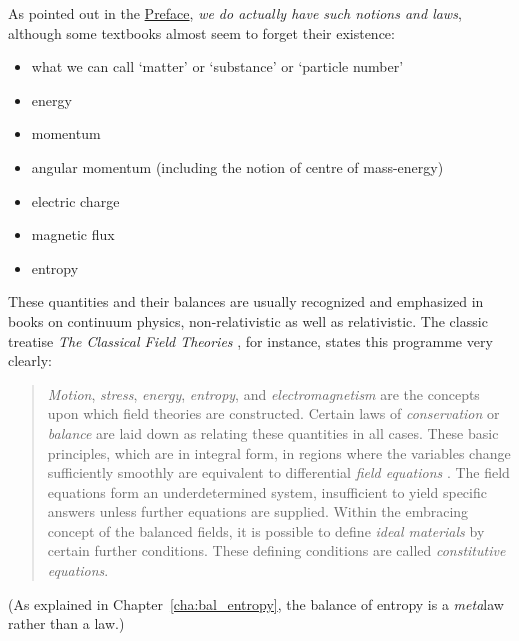 \documentclass[a4paper,12pt,%
onecolumn,oneside,%
british%
]{memoir}
\renewcommand*{\|}[1][]{\nonscript\:#1\vert\nonscript\:\mathopen{}}
\newcommand*{\chap}{Chapter}%
\newcommand*{\masse}{mass-energy}
\begin{document}
As pointed out in the \hyperref[cha:preface]{Preface}, \emph{we do actually have such notions and laws}, although some textbooks almost seem to forget their existence:
\begin{itemize}[nosep]
\item what we can call \enquote*{matter} or \enquote*{substance} or \enquote*{particle number}
\item energy
\item momentum
\item angular momentum (including the notion of centre of \masse)
\item electric charge
\item magnetic flux
\item entropy
\end{itemize}
These quantities and their balances are usually recognized and emphasized in books on continuum physics, non-relativistic as well as relativistic. The classic treatise \emph{The Classical Field Theories} \parencites*{truesdelletal1960}, for instance, states this programme very clearly:
\begin{quote}
  \emph{Motion}, \emph{stress}, \emph{energy}, \emph{entropy}, and \emph{electromagnetism} are the concepts upon which field theories are constructed. Certain laws of \emph{conservation} or \emph{balance} are laid down as relating these quantities in all cases. These basic principles, which are in integral form, in regions where the variables change sufficiently smoothly are equivalent to differential \emph{field equations} \textelp{}. The field equations \textelp{} form an underdetermined system, insufficient to yield specific answers unless further equations are supplied. Within the embracing concept of the balanced fields, it is possible to define \emph{ideal materials} by certain further conditions. These defining conditions are called \emph{constitutive equations}.
\end{quote}
(As explained in \chap~\ref{cha:bal_entropy}, the balance of entropy is a \emph{meta}law rather than a law.)

\medskip
\end{document}
